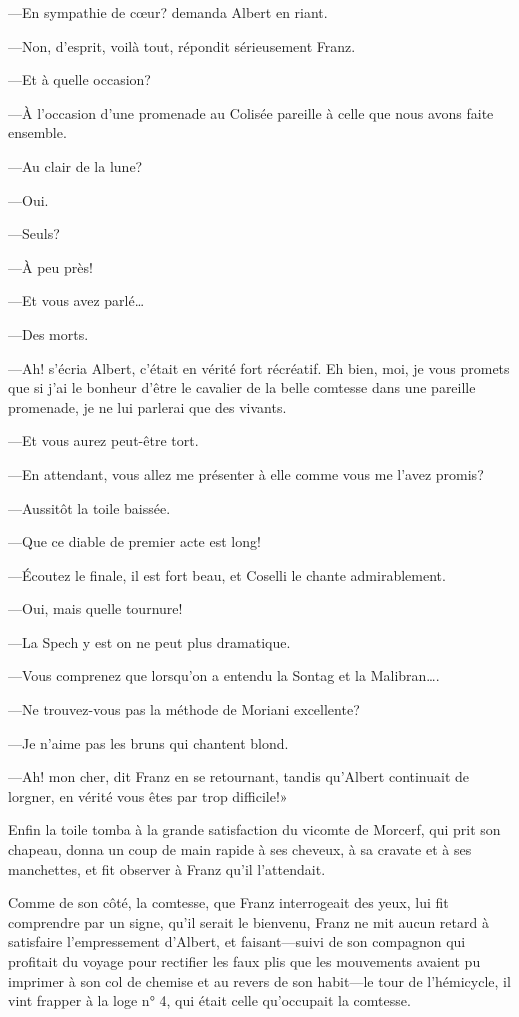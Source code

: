 —En sympathie de cœur? demanda Albert en riant. 

—Non, d'esprit, voilà tout, répondit sérieusement Franz. 

—Et à quelle occasion? 

—À l'occasion d'une promenade au Colisée pareille à celle que nous avons faite ensemble. 

—Au clair de la lune?  

—Oui. 

—Seuls? 

—À peu près! 

—Et vous avez parlé\dots 

—Des morts. 

—Ah! s'écria Albert, c'était en vérité fort récréatif. Eh bien, moi, je vous promets que si j'ai le bonheur d'être le cavalier de la belle comtesse dans une pareille promenade, je ne lui parlerai que des vivants.  

—Et vous aurez peut-être tort. 

—En attendant, vous allez me présenter à elle comme vous me l'avez promis? 

—Aussitôt la toile baissée. 

—Que ce diable de premier acte est long! 

—Écoutez le finale, il est fort beau, et Coselli le chante admirablement. 

—Oui, mais quelle tournure!  

—La Spech y est on ne peut plus dramatique. 

—Vous comprenez que lorsqu'on a entendu la Sontag et la Malibran\dots. 

—Ne trouvez-vous pas la méthode de Moriani excellente? 

—Je n'aime pas les bruns qui chantent blond. 

—Ah! mon cher, dit Franz en se retournant, tandis qu'Albert continuait de lorgner, en vérité vous êtes par trop difficile!» 

Enfin la toile tomba à la grande satisfaction du vicomte de Morcerf, qui prit son chapeau, donna un coup de main rapide à ses cheveux, à sa cravate et à ses manchettes, et fit observer à Franz qu'il l'attendait. 

Comme de son côté, la comtesse, que Franz interrogeait des yeux, lui fit comprendre par un signe, qu'il serait le bienvenu, Franz ne mit aucun retard à satisfaire l'empressement d'Albert, et faisant—suivi de son compagnon qui profitait du voyage pour rectifier les faux plis que les mouvements avaient pu imprimer à son col de chemise et au revers de son habit—le tour de l'hémicycle, il vint frapper à la loge n° 4, qui était celle qu'occupait la comtesse. 

